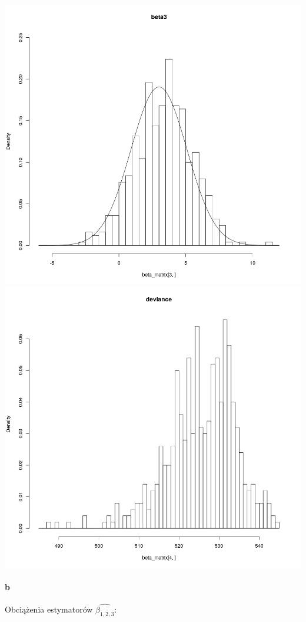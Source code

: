 \documentclass[a4paper,11pt]{article}
\begin{document}
\includegraphics[scale=.35]{523.png} 
\includegraphics[scale=.35]{524.png} 



\paragraph{b} Obciążenia estymatorów $\widehat{\beta_{1, 2, 3}}$:
\end{document}
